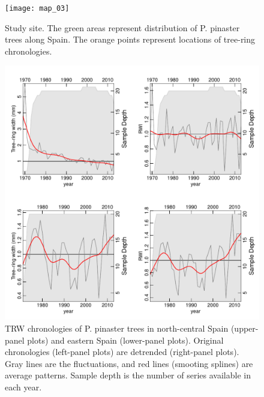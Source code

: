 \documentclass[review,authoryear]{elsarticle}
\begin{document}
\clearpage
\begin{figure}\centering
\texttt{[image: map\_03]} 
\caption{Study site. The green areas represent distribution of
  \gls{P. pinaster} trees along Spain. The orange points represent
  locations of tree-ring chronologies.}
\label{fig:map_03} 
\end{figure}

\clearpage
\begin{figure}\centering
\includegraphics[scale=0.7,trim=20mm 0mm 20mm 0mm]{RWIs} 
\caption{\gls{TRW} chronologies of \acrshort{P. pinaster} trees in
  north-central Spain (upper-panel plots) and eastern Spain
  (lower-panel plots). Original chronologies (left-panel plots) are
  detrended (right-panel plots). Gray lines are the fluctuations, and
  red lines (smooting splines) are average patterns. Sample depth is
  the number of series available in each year.}
\label{fig:RWIs} 
\end{figure}
\end{document}
